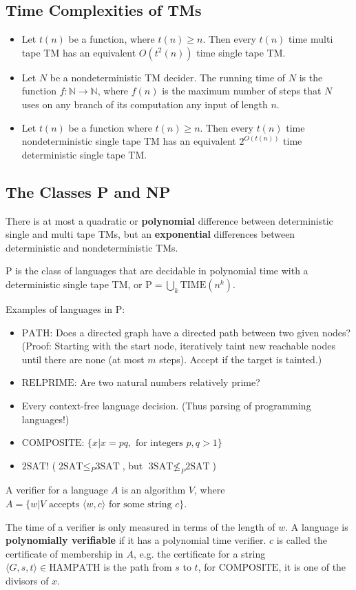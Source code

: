 \documentclass[9pt, twocolumn]{extarticle}
\newcommand{\definition}[2]{%
  \begin{definitionbox}{\titlecap{#1}}
    #2
  \end{definitionbox}
}
\begin{document}
  \subsection{Time Complexities of TMs}
  \begin{itemize}
    \item Let $t(n)$ be a function, where $t(n)\ge n$. Then every $t(n)$ time multi tape TM has an equivalent $O(t^2(n))$ time single tape TM.
    \item Let $N$ be a nondeterministic TM decider. The running time of $N$ is the function $f:\mathbb{N}\rightarrow\mathbb{N}$, where $f(n)$ is the maximum number of steps that $N$ uses on any branch of its computation any input of length $n$.
    \item Let $t(n)$ be a function where $t(n)\ge n$. Then every $t(n)$ time nondeterministic single tape TM has an equivalent $2^{O(t(n))}$ time deterministic single tape TM.
  \end{itemize}

  \subsection{The Classes P and NP}
  There is at most a quadratic or \textbf{polynomial} difference between deterministic single and multi tape TMs, but an \textbf{exponential} differences between deterministic and nondeterministic TMs.
  \definition{The Class P}{P is the class of languages that are decidable in polynomial time with a deterministic single tape TM, or $\displaystyle \text{P}=\bigcup_k\text{TIME}(n^k)$.}
  Examples of languages in P:
  \begin{itemize}
    \item $\text{PATH}$: Does a directed graph have a directed path between two given nodes? (Proof: Starting with the start node, iteratively taint new reachable nodes until there are none (at most $m$ steps). Accept if the target is tainted.)
    \item $\text{RELPRIME}$: Are two natural numbers relatively prime?
    \item Every context-free language decision. (Thus parsing of programming languages!)
    \item $\text{COMPOSITE}$: $\{x|x=pq,\text{ for integers }p,q>1\}$
    \item $\text{2SAT}$! ($\text{2SAT}\le_P \text{3SAT}$, but $\text{3SAT}\not\le_P\text{2SAT}$)
  \end{itemize}

  \definition{Verifier}{A verifier for a language $A$ is an algorithm $V$, where $A=\{w|V\text{ accepts }\langle w,c\rangle\text{ for some string }c\}$.}
  The time of a verifier is only measured in terms of the length of $w$. A language is \textbf{polynomially verifiable} if it has a polynomial time verifier. $c$ is called the certificate of membership in $A$, e.g. the certificate for a string $\langle G,s,t\rangle\in\text{HAMPATH}$ is the path from $s$ to $t$, for $\text{COMPOSITE}$, it is one of the divisors of $x$.
\end{document}
